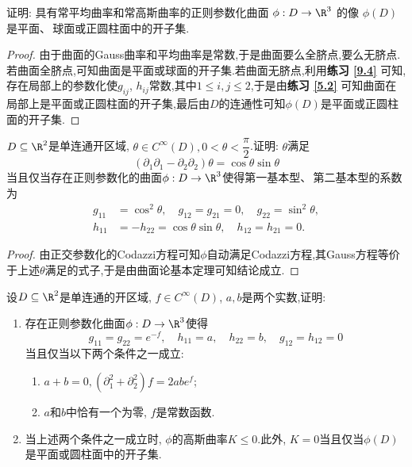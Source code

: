 	\begin{excise}\label{9.5}
		证明: 具有常平均曲率和常高斯曲率的正则参数化曲面 $\phi : D \to \R^3 $ 的像 $\phi(D)$ 是平面、\,球面或正圆柱面中的开子集.
	\end{excise}
	\begin{proof}
		由于曲面的Gauss曲率和平均曲率是常数,于是曲面要么全脐点,要么无脐点.若曲面全脐点,可知曲面是平面或球面的开子集.若曲面无脐点,利用\textbf{练习 \ref{9.4}} 可知,存在局部上的参数化使$g_{ij}$, $h_{ij}$常数,其中$1\leqslant i,j\leqslant 2$,于是由\textbf{练习 \ref{5.2}} 可知曲面在局部上是平面或正圆柱面的开子集,最后由$D$的连通性可知$\phi(D)$是平面或正圆柱面的开子集.
	\end{proof}
	\begin{excise}
		$D\subseteq\R^{2}$是单连通开区域, $\theta\in C^{\infty}(D), 0<\theta<\dfrac{\pi}{2}$.证明: $\theta$满足
		$$
		(\partial_{1}\partial_{1}-\partial_{2}\partial_{2})\theta=\cos\theta\sin\theta
		$$
		当且仅当存在正则参数化的曲面$\phi: D\to\R^{3}$使得第一基本型、\,第二基本型的系数为
		\begin{align*}
		g_{11}&=\cos^{2}\theta,\quad g_{12}=g_{21}=0,\quad g_{22}=\sin^{2}\theta,\\
		h_{11}&=-h_{22}=\cos\theta\sin\theta,\quad h_{12}=h_{21}=0.
		\end{align*}
	\end{excise}
	\begin{proof}
		由正交参数化的Codazzi方程可知$\phi$自动满足Codazzi方程,其Gauss方程等价于上述$\theta$满足的式子,于是由曲面论基本定理可知结论成立.
	\end{proof}
	\begin{excise}
		设$D\subseteq\R^{2}$是单连通的开区域, $f\in C^{\infty}(D)$, $a,b$是两个实数,证明:
		\begin{enumerate}[label=(\arabic*)]
			\item 存在正则参数化曲面$\phi: D\to\R^{3}$使得
			$$
			g_{11}=g_{22}=e^{-f},\quad h_{11}=a,\quad h_{22}=b,\quad g_{12}=h_{12}=0
			$$
			当且仅当以下两个条件之一成立:
			\begin{enumerate}[label=(\roman*)]
				\item $a+b=0,(\partial_{1}^{2}+\partial_{2}^{2})f=2abe^{f}$;
				\item $a$和$b$中恰有一个为零, $f$是常数函数.
			\end{enumerate}
			\item 当上述两个条件之一成立时, $\phi$的高斯曲率$K\leqslant 0$.此外, $K=0$当且仅当$\phi(D)$是平面或圆柱面中的开子集.
		\end{enumerate}
	\end{excise}
